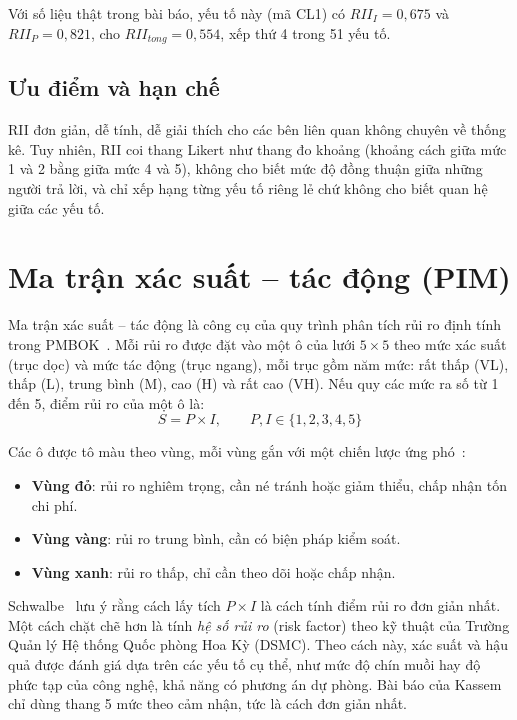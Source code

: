 Với số liệu thật trong bài báo, yếu tố này (mã CL1) có $RII_I = 0{,}675$ và $RII_P = 0{,}821$, cho $RII_{tong} = 0{,}554$, xếp thứ 4 trong 51 yếu tố.

\subsection{Ưu điểm và hạn chế}

RII đơn giản, dễ tính, dễ giải thích cho các bên liên quan không chuyên về thống kê. Tuy nhiên, RII coi thang Likert như thang đo khoảng (khoảng cách giữa mức 1 và 2 bằng giữa mức 4 và 5), không cho biết mức độ đồng thuận giữa những người trả lời, và chỉ xếp hạng từng yếu tố riêng lẻ chứ không cho biết quan hệ giữa các yếu tố.

\section{Ma trận xác suất -- tác động (PIM)}
\label{sec:pim}

Ma trận xác suất -- tác động là công cụ của quy trình phân tích rủi ro định tính trong PMBOK~\cite{pmbok6}. Mỗi rủi ro được đặt vào một ô của lưới $5 \times 5$ theo mức xác suất (trục dọc) và mức tác động (trục ngang), mỗi trục gồm năm mức: rất thấp (VL), thấp (L), trung bình (M), cao (H) và rất cao (VH). Nếu quy các mức ra số từ 1 đến 5, điểm rủi ro của một ô là:
\begin{equation}
S = P \times I, \qquad P, I \in \{1, 2, 3, 4, 5\}
\label{eq:pim}
\end{equation}

Các ô được tô màu theo vùng, mỗi vùng gắn với một chiến lược ứng phó~\cite{kassem2022,pmbok6}:
\begin{itemize}
  \item \textbf{Vùng đỏ}: rủi ro nghiêm trọng, cần né tránh hoặc giảm thiểu, chấp nhận tốn chi phí.
  \item \textbf{Vùng vàng}: rủi ro trung bình, cần có biện pháp kiểm soát.
  \item \textbf{Vùng xanh}: rủi ro thấp, chỉ cần theo dõi hoặc chấp nhận.
\end{itemize}

Schwalbe~\cite{schwalbe2019} lưu ý rằng cách lấy tích $P \times I$ là cách tính điểm rủi ro đơn giản nhất. Một cách chặt chẽ hơn là tính \emph{hệ số rủi ro} (risk factor) theo kỹ thuật của Trường Quản lý Hệ thống Quốc phòng Hoa Kỳ (DSMC). Theo cách này, xác suất và hậu quả được đánh giá dựa trên các yếu tố cụ thể, như mức độ chín muồi hay độ phức tạp của công nghệ, khả năng có phương án dự phòng. Bài báo của Kassem chỉ dùng thang 5 mức theo cảm nhận, tức là cách đơn giản nhất.

